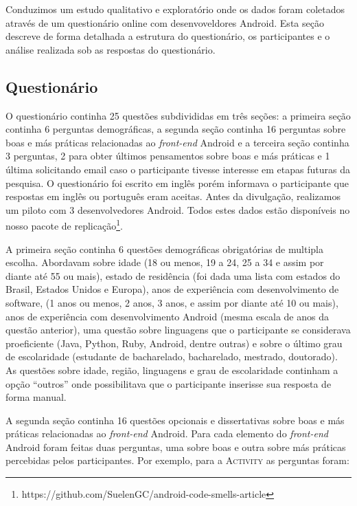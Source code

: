 Conduzimos um estudo qualitativo e explorat\'orio onde os dados foram coletados atrav\'es de um question\'ario online com desenvoveldores Android. Esta se\c{c}\~ao descreve de forma detalhada a estrutura do question\'ario, os participantes e o an\'alise realizada sob as respostas do question\'ario.

\subsection{Question\'ario}
\label{sub:questionario}

O question\'ario continha 25 quest\~oes subdivididas em tr\^es se\c{c}\~oes: a primeira se\c{c}\~ao continha 6 perguntas demogr\'aficas, a segunda se\c{c}\~ao continha 16 perguntas sobre boas e m\'as pr\'aticas relacionadas ao \textit{front-end} Android e a terceira se\c{c}\~ao continha 3 perguntas, 2 para obter \'ultimos pensamentos sobre boas e m\'as pr\'aticas e 1 \'ultima solicitando email caso o participante tivesse interesse em etapas futuras da pesquisa. O question\'ario foi escrito em ingl\^es por\'em informava o participante que respostas em ingl\^es ou portugu\^es eram aceitas. Antes da divulga\c{c}\~ao, realizamos um piloto com 3 desenvolvedores Android. Todos estes dados est\~ao dispon\'iveis no nosso pacote de replica\c{c}\~ao\footnote{https://github.com/SuelenGC/android-code-smells-article}.

A primeira se\c{c}\~ao continha 6 quest\~oes demogr\'aficas obrigat\'orias de multipla escolha. Abordavam sobre idade (18 ou menos, 19 a 24, 25 a 34 e assim por diante at\'e 55 ou mais), estado de resid\^encia (foi dada uma lista com estados do Brasil, Estados Unidos e Europa), anos de experi\^encia com desenvolvimento de software, (1 anos ou menos, 2 anos, 3 anos, e assim por diante at\'e 10 ou mais), anos de experi\^encia com desenvolvimento Android (mesma escala de anos da quest\~ao anterior), uma quest\~ao sobre linguagens que o participante se considerava proeficiente (Java, Python, Ruby, Android, dentre outras) e sobre o \'ultimo grau de escolaridade (estudante de bacharelado, bacharelado, mestrado, doutorado). As quest\~oes sobre idade, regi\~ao, linguagens e grau de escolaridade continham a op\c{c}\~ao ``outros'' onde possibilitava que o participante inserisse sua resposta de forma manual.

A segunda se\c{c}\~ao continha 16 quest\~oes opcionais e dissertativas sobre boas e m\'as pr\'aticas relacionadas ao \textit{front-end} Android. Para cada elemento do \textit{front-end} Android foram feitas duas perguntas, uma sobre boas e outra sobre m\'as pr\'aticas percebidas pelos participantes. Por exemplo, para a \textsc{Activity} as perguntas foram:

